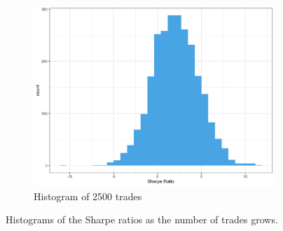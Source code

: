 \documentclass[10pt,leter,openany]{article}
\begin{document}
\begin{figure}
\begin{subfigure}[b]{0.6\textwidth}
		\centering 
		\includegraphics[width=\textwidth]{img/hist2500}
		\caption[]%
		{{\small Histogram of 2500 trades}}    
		\label{fig:2500trades}
	\end{subfigure}
\caption[ ]
{\small Histograms of the Sharpe ratios as the number of trades grows.} 
\label{fig:trades}
\end{figure}


		
\clearpage

	
	
	
\end{document}
